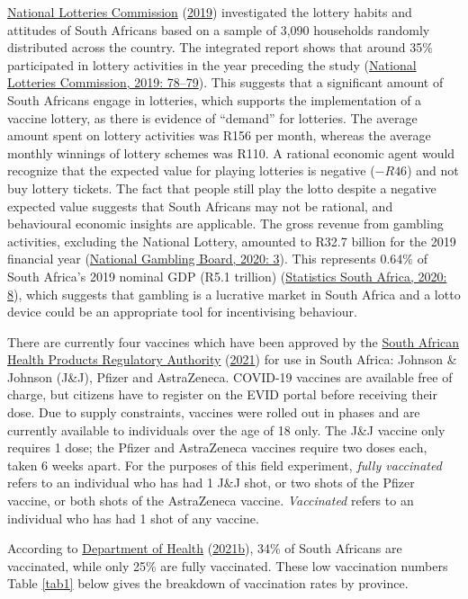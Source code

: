 \documentclass[11pt,preprint, authoryear]{elsarticle}
\numberwithin{equation}{section}
\numberwithin{figure}{section}
\numberwithin{table}{section}
\begin{document}
\protect\hyperlink{ref-lotto}{National Lotteries Commission}
(\protect\hyperlink{ref-lotto}{2019}) investigated the lottery habits
and attitudes of South Africans based on a sample of 3,090 households
randomly distributed across the country. The integrated report shows
that around 35\% participated in lottery activities in the year
preceding the study (\protect\hyperlink{ref-lotto}{National Lotteries
Commission, 2019: 78--79}). This suggests that a significant amount of
South Africans engage in lotteries, which supports the implementation of
a vaccine lottery, as there is evidence of ``demand'' for lotteries. The
average amount spent on lottery activities was R156 per month, whereas
the average monthly winnings of lottery schemes was R110. A rational
economic agent would recognize that the expected value for playing
lotteries is negative (\(-R46\)) and not buy lottery tickets. The fact
that people still play the lotto despite a negative expected value
suggests that South Africans may not be rational, and behavioural
economic insights are applicable. The gross revenue from gambling
activities, excluding the National Lottery, amounted to R32.7 billion
for the 2019 financial year (\protect\hyperlink{ref-gamble}{National
Gambling Board, 2020: 3}). This represents 0.64\% of South Africa's 2019
nominal GDP (R5.1 trillion) (\protect\hyperlink{ref-statsa}{Statistics
South Africa, 2020: 8}), which suggests that gambling is a lucrative
market in South Africa and a lotto device could be an appropriate tool
for incentivising behaviour.

There are currently four vaccines which have been approved by the
\protect\hyperlink{ref-sah}{South African Health Products Regulatory
Authority} (\protect\hyperlink{ref-sah}{2021}) for use in South Africa:
Johnson \& Johnson (J\&J), Pfizer and AstraZeneca. COVID-19 vaccines are
available free of charge, but citizens have to register on the EVID
portal before receiving their dose. Due to supply constraints, vaccines
were rolled out in phases and are currently available to individuals
over the age of 18 only. The J\&J vaccine only requires 1 dose; the
Pfizer and AstraZeneca vaccines require two doses each, taken 6 weeks
apart. For the purposes of this field experiment, \emph{fully
vaccinated} refers to an individual who has had 1 J\&J shot, or two
shots of the Pfizer vaccine, or both shots of the AstraZeneca vaccine.
\emph{Vaccinated} refers to an individual who has had 1 shot of any
vaccine.

According to \protect\hyperlink{ref-stat}{Department of Health}
(\protect\hyperlink{ref-stat}{2021b}), 34\% of South Africans are
vaccinated, while only 25\% are fully vaccinated. These low vaccination
numbers Table \ref{tab1} below gives the breakdown of vaccination rates
by province.
\end{document}
